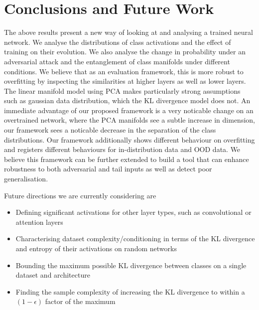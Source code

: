 \documentclass{article}
\begin{document}
        
    \section{Conclusions and Future Work}
        The above results present a new way of looking at and analysing a trained neural network. We analyse the distributions of class activations and the effect of training on their evolution. We also analyse the change in probability under an adversarial attack and the entanglement of class manifolds under different conditions. We believe that as an evaluation framework, this is more robust to overfitting by inspecting the similarities at higher layers as well as lower layers. The linear manifold model using PCA makes particularly strong assumptions such as gaussian data distribution, which the KL divergence model does not. An immediate advantage of our proposed framework is a very noticable change on an overtrained network, where the PCA manifolds see a subtle increase in dimension, our framework sees a noticable decrease in the separation of the class distributions. Our framework additionally shows different behaviour on overfitting and registers different behaviours for in-distribution data and OOD data. We believe this framework can be further extended to build a tool that can enhance robustness to both adversarial and tail inputs as well as detect poor generalisation. 

        Future directions we are currently considering are
        \begin{itemize}
            \item 
                Defining significant activations for other layer types, such as convolutional or attention layers
            \item 
                Characterising dataset complexity/conditioning in terms of the KL divergence and entropy of their activations on random networks
            \item 
                Bounding the maximum possible KL divergence between classes on a single dataset and architecture
            \item 
                Finding the sample complexity of increasing the KL divergence to within a $(1 - \epsilon)$ factor of the maximum
        \end{itemize} 
    
    
\end{document}
